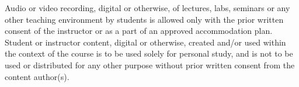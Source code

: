 \documentclass[11pt,]{article}
\begin{document}
Audio or video recording, digital or otherwise, of lectures, labs,
seminars or any other teaching environment by students is allowed only
with the prior written consent of the instructor or as a part of an
approved accommodation plan. Student or instructor content, digital or
otherwise, created and/or used within the context of the course is to be
used solely for personal study, and is not to be used or distributed for
any other purpose without prior written consent from the content
author(s).
\end{document}
